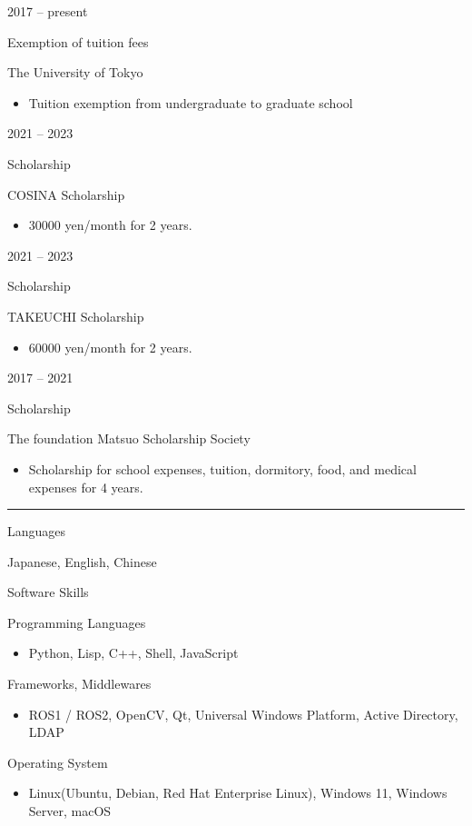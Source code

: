 \documentclass[a4paper,10pt]{article}
\newlength{\cvcolumngapwidth}
\newlength{\cvleftcolumnwidth}
\newlength{\cvrightcolumnwidth}
\newcommand{\cvsectionstyle}[1]{{\normalsize\cvsectionfont\textcolor{cvsectioncolor}{#1}}}
\newcommand{\cvtitlestyle}[1]{{\large\cvtitlefont\textcolor{cvtitlecolor}{#1}}}
\newcommand{\cvdurationstyle}[1]{{\small\cvdurationfont\textcolor{cvdurationcolor}{#1}}}
\newcommand{\cvheadingstyle}[1]{{\normalsize\cvheadingfont\textcolor{cvheadingcolor}{#1}}}
\newlength{\cvafteritemskipamount}
\newlength{\cvaftersectionskipamount}
\newlength{\cvbetweensectionandheadingextraskipamount}
\newlength{\cvaftertitleskipamount}
\newlength{\cvparskip}
\newcommand{\cvsection}[1]{
    \begin{minipage}[t]{\cvleftcolumnwidth}
        \raggedleft\cvsectionstyle{#1}
    \end{minipage}%
    \hspace{\cvcolumngapwidth}%
    \begin{minipage}[t]{\cvrightcolumnwidth}
        \textcolor{cvrulecolor}{\rule{\cvrightcolumnwidth}{0.3mm}}
    \end{minipage}

    \vspace{\cvaftersectionskipamount}
}
\newcommand{\cvitem}[2]{
    \begin{minipage}[t]{\cvleftcolumnwidth}
        \raggedleft #1
    \end{minipage}%
    \hspace{\cvcolumngapwidth}%
    \begin{minipage}[t]{\cvrightcolumnwidth}
        \setlength{\parskip}{\cvparskip} #2
    \end{minipage}

    \vspace{\cvafteritemskipamount}
}
\newcommand{\cvtitle}[1]{
    \cvtitlestyle{#1}

    \vspace{\cvaftertitleskipamount}
    \vspace{-\cvparskip}
}
\begin{document}
\cvitem{
    \cvdurationstyle{2017 -- present}
}{
    \cvtitle{Exemption of tuition fees}

    The University of Tokyo

    \begin{itemize}[leftmargin=*]
        \item Tuition exemption from undergraduate to graduate school
    \end{itemize}
}

\cvitem{
    \cvdurationstyle{2021 -- 2023}
}{
    \cvtitle{Scholarship}

    COSINA Scholarship

    \begin{itemize}[leftmargin=*]
        \item 30000 yen/month for 2 years.
    \end{itemize}
}

\cvitem{
    \cvdurationstyle{2021 -- 2023}
}{
    \cvtitle{Scholarship}

    TAKEUCHI Scholarship

    \begin{itemize}[leftmargin=*]
        \item 60000 yen/month for 2 years.
    \end{itemize}
}


\cvitem{
    \cvdurationstyle{2017 -- 2021}
}{
  \cvtitle{Scholarship}

  The foundation Matsuo Scholarship Society

  \begin{itemize}[leftmargin=*]
  \item Scholarship for school expenses, tuition, dormitory, food, and medical expenses for 4 years.
  \end{itemize}
}



\cvsection{SKILLS}

\vspace{\cvbetweensectionandheadingextraskipamount}

\cvitem{
    \cvheadingstyle{Languages}
}{
  Japanese, English, Chinese
}

\cvitem{
    \cvheadingstyle{Software Skills}
}{
  Programming Languages
  \begin{itemize}
    \item Python, Lisp, C++, Shell, JavaScript
  \end{itemize}
  Frameworks, Middlewares
  \begin{itemize}
    \item ROS1 / ROS2, OpenCV, Qt, Universal Windows Platform, Active Directory, LDAP
  \end{itemize}
  Operating System
  \begin{itemize}
    \item Linux(Ubuntu, Debian, Red Hat Enterprise Linux), Windows 11, Windows Server, macOS
  \end{itemize}
}
\end{document}
